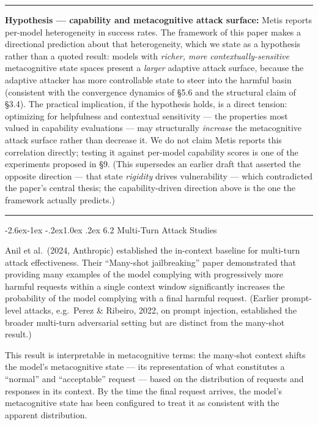 \documentclass[
  11pt,
]{article}
\makeatletter
\renewcommand\subsection{\@startsection{subsection}{2}{\z@}%
  {-2.6ex\@plus -1ex \@minus -.2ex}{1.0ex \@plus .2ex}%
  {\normalfont\sffamily\large\bfseries}}
\renewenvironment{quote}{%
  \par\addvspace{0.7em}%
  \noindent\rule{\linewidth}{1.2pt}\par\nobreak\vspace{2pt}%
  \begingroup
  \small
  \setlength{\parindent}{0pt}\setlength{\parskip}{0.3em}%
  \setlength{\leftskip}{0.9em}\setlength{\rightskip}{0.4em}%
  \ignorespaces
}{%
  \par\endgroup\vspace{2pt}%
  \noindent\rule{\linewidth}{0.4pt}\par\addvspace{0.7em}%
}
\makeatother
\begin{document}
\begin{quote}
\textbf{Hypothesis --- capability and metacognitive attack surface:}
Metis reports per-model heterogeneity in success rates. The framework of
this paper makes a directional prediction about that heterogeneity, which
we state as a hypothesis rather than a quoted result: models with
\emph{richer, more contextually-sensitive} metacognitive state spaces
present a \emph{larger} adaptive attack surface, because the adaptive
attacker has more controllable state to steer into the harmful basin
(consistent with the convergence dynamics of \S5.6 and the structural
claim of \S3.4). The practical implication, if the hypothesis holds, is a
direct tension: optimizing for helpfulness and contextual sensitivity ---
the properties most valued in capability evaluations --- may structurally
\emph{increase} the metacognitive attack surface rather than decrease it.
We do not claim Metis reports this correlation directly; testing it
against per-model capability scores is one of the experiments proposed in
\S9. (This supersedes an earlier draft that asserted the opposite
direction --- that state \emph{rigidity} drives vulnerability --- which
contradicted the paper's central thesis; the capability-driven direction
above is the one the framework actually predicts.)
\end{quote}

\subsection{6.2 Multi-Turn Attack
Studies}\label{multi-turn-attack-studies}

Anil et al.\ (2024, Anthropic) established the in-context baseline for
multi-turn attack effectiveness. Their ``Many-shot jailbreaking'' paper
demonstrated that providing many examples of the model complying with
progressively more harmful requests within a single context window
significantly increases the probability of the model complying with a
final harmful request. (Earlier prompt-level attacks, e.g.\ Perez \&
Ribeiro, 2022, on prompt injection, established the broader multi-turn
adversarial setting but are distinct from the many-shot result.)

This result is interpretable in metacognitive terms: the many-shot
context shifts the model's metacognitive state --- its representation of
what constitutes a ``normal'' and ``acceptable'' request --- based on
the distribution of requests and responses in its context. By the time
the final request arrives, the model's metacognitive state has been
configured to treat it as consistent with the apparent distribution.
\end{document}
